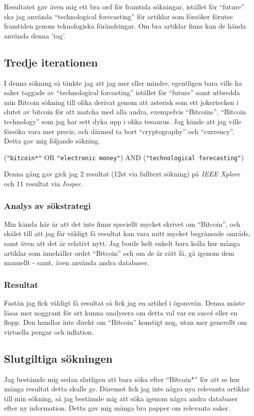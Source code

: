 \documentclass[a4paper,11pt,exjobb]{kth-mag}
\begin{document}
Resultatet gav även mig ett bra ord för framtida sökningar, istället för ``future'' ska jag använda ``technological forecasting'' för artiklar som försöker förutse framtiden genom teknologiska förändringar. Om bra artiklar finns kan de hända använda denna 'tag'.

\subsection{Tredje iterationen}
\label{sec:hard}
I denna sökning så tänkte jag att jag mer eller mindre, egentligen bara ville ha saker taggade av ``technological forcasting'' istället för ``future'' samt utbredda min Bitcoin sökning till olika derivat genom att asterisk som ett jokertecken i slutet av bitcoin för att matcha med alla andra, exempelvis ``Bitcoins'', ``Bitcoin technology'' som jag har sett dyka upp i olika tesaurus. Jag kände att jag ville försöka vara mer precis, och därmed ta bort ``cryptography'' och ``currency''.
Detta gav mig följande sökning.
\begin{center}
(\verb#"bitcoin*"# \textsc{OR} \verb#"electronic money"#) \textsc{AND} (\verb#"technological forecasting"#)
\end{center}

Denna gång gav gick jag 2 resultat (12st via fulltext sökning) på \textit{IEEE Xplore} och 11 resultat via \textit{Inspec}.

\subsubsection{Analys av sökstrategi}
Min känsla här är att det inte finns speciellt mycket skrivet om ``Bitcoin'', och skälet till att jag får väldigt få resultat kan vara mitt mycket begränsade område, samt även att det är relativt nytt. Jag borde helt enkelt bara kolla hur många artiklar som innehåller ordet ``Bitcoin'' och om de är rätt få, gå igenom dem manuellt - samt, även använda andra databaser.

\subsubsection{Resultat}
Fastän jag fick väldigt få resultat så fick jag en artikel i ögonvrån\cite{tre}.
Denna måste läsas mer noggrant för att kunna analysera om detta val var en succé eller en flopp. Den handlar inte direkt om ``Bitcoin'' konstigt nog, utan mer generellt om virtuella pengar och inflation.

\subsection{Slutgiltiga sökningen}
\label{sec:database}
Jag bestämde mig sedan slutligen att bara söka efter ``Bitcoin*'' för att se hur många resultat detta skulle ge. 
Däremot fick jag inte några nya relevanta artiklar till min sökning, så jag bestämde mig att söka igenom några andra databaser efter ny information. Detta gav mig många bra papper om relevanta saker.
\end{document}
